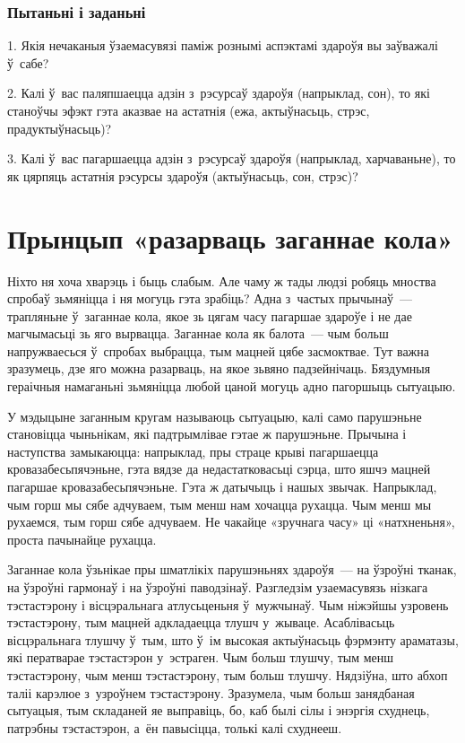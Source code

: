 \subsubsection{Пытаньні і заданьні}

1. Якія нечаканыя ўзаемасувязі паміж рознымі аспэктамі здароўя вы заўважалі ў~сабе?

2. Калі ў~вас паляпшаецца адзін з~рэсурсаў здароўя (напрыклад, сон), то які станоўчы эфэкт гэта аказвае на астатнія (ежа, актыўнасьць, стрэс, прадуктыўнасьць)?

3. Калі ў~вас пагаршаецца адзін з~рэсурсаў здароўя (напрыклад, харчаваньне), то як цярпяць астатнія рэсурсы здароўя (актыўнасьць, сон, стрэс)?


\section{Прынцып «разарваць заганнае кола»}

Ніхто ня хоча хварэць і быць слабым. Але чаму ж тады людзі робяць мноства спробаў зьмяніцца і ня могуць гэта зрабіць? Адна з~частых прычынаў~--- трапляньне ў~заганнае кола, якое зь цягам часу пагаршае здароўе і не дае магчымасьці зь яго вырвацца. Заганнае кола як балота~--- чым больш напружваесься ў~спробах выбрацца, тым мацней цябе засмоктвае. Тут важна зразумець, дзе яго можна разарваць, на якое зьвяно падзейнічаць. Бяздумныя гераічныя намаганьні зьмяніцца любой цаной могуць адно пагоршыць сытуацыю.

У мэдыцыне заганным кругам называюць сытуацыю, калі само парушэньне становіцца чыньнікам, які падтрымлівае гэтае ж парушэньне. Прычына і наступства замыкаюцца: напрыклад, пры страце крыві пагаршаецца кровазабесьпячэньне, гэта вядзе да недастатковасьці сэрца, што яшчэ мацней пагаршае кровазабесьпячэньне. Гэта ж датычыць і нашых звычак. Напрыклад, чым горш мы сябе адчуваем, тым менш нам хочацца рухацца. Чым менш мы рухаемся, тым горш сябе адчуваем. Не чакайце «зручнага часу» ці «натхненьня», проста пачынайце рухацца.

Заганнае кола ўзьнікае пры шматлікіх парушэньнях здароўя~--- на ўзроўні тканак, на ўзроўні гармонаў і на ўзроўні паводзінаў. Разгледзім узаемасувязь нізкага тэстастэрону і вісцэральнага атлусьценьня ў~мужчынаў. Чым ніжэйшы узровень тэстастэрону, тым мацней адкладаецца тлушч у~жываце. Асаблівасьць вісцэральнага тлушчу ў~тым, што ў~ім высокая актыўнасьць фэрмэнту араматазы, які ператварае тэстастэрон у~эстраген. Чым больш тлушчу, тым менш тэстастэрону, чым менш тэстастэрону, тым больш тлушчу. Нядзіўна, што абхоп таліі карэлюе з~узроўнем тэстастэрону. Зразумела, чым больш занядбаная сытуацыя, тым складаней яе выправіць, бо, каб былі сілы і энэргія схуднець, патрэбны тэстастэрон, а~ён павысіцца, толькі калі схуднееш.

